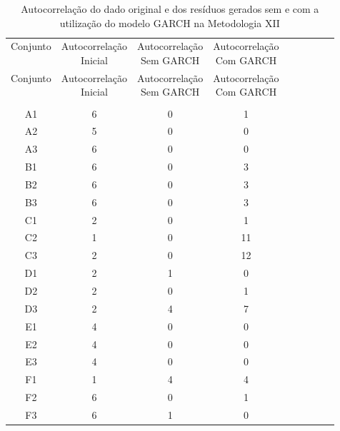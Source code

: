 \begin{center}
\begin{longtable}{ccccc|cccc}
\toprule
\rowcolor{white}
\caption[Metodologia XII: evolução da autocorrelação]{Autocorrelação do dado
original e dos resíduos gerados sem e com a utilização do modelo GARCH na
Metodologia XII} \label{tab:EvolucaoAutocorrelacaoMet12}\\
\midrule
Conjunto & \specialcell{Autocorrelação\\Inicial} & \specialcell{Autocorrelação\\Sem
GARCH} & \specialcell{Autocorrelação\\Com GARCH} \\
\midrule
\endfirsthead 
\midrule
\rowcolor{white}
Conjunto & \specialcell{Autocorrelação\\Inicial} & \specialcell{Autocorrelação\\Sem
GARCH} & \specialcell{Autocorrelação\\Com GARCH} \\
\toprule
\endhead
\midrule \\ %
\endfoot
\bottomrule 
\endlastfoot
A1    & 6     & 0     & 1 \\
A2    & 5     & 0     & 0 \\
A3    & 6     & 0     & 0 \\
B1    & 6     & 0     & 3 \\
B2    & 6     & 0     & 3 \\
B3    & 6     & 0     & 3 \\
C1    & 2     & 0     & 1 \\
C2    & 1     & 0     & 11 \\
C3    & 2     & 0     & 12 \\
D1    & 2     & 1     & 0 \\
D2    & 2     & 0     & 1 \\
D3    & 2     & 4     & 7 \\
E1    & 4     & 0     & 0 \\
E2    & 4     & 0     & 0 \\
E3    & 4     & 0     & 0 \\
F1    & 1     & 4     & 4 \\
F2    & 6     & 0     & 1 \\
F3    & 6     & 1     & 0 \\

\end{longtable}
\end{center}
